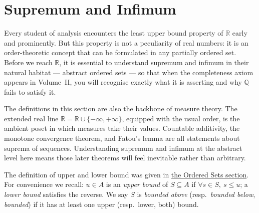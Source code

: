 
\section{Supremum and Infimum}\label{sec:sup-inf}



\begin{exposition}
Every student of analysis encounters the least upper bound property of
$\mathbb{R}$ early and prominently.  But this property is not a peculiarity
of real numbers: it is an order-theoretic concept that can be formulated in
any partially ordered set.  Before we reach $\mathbb{R}$, it is essential to
understand supremum and infimum in their natural habitat --- abstract ordered
sets --- so that when the completeness axiom appears in Volume~II, you will
recognise exactly what it is asserting and why $\mathbb{Q}$ fails to satisfy it.
\end{exposition}

\begin{exposition}
The definitions in this section are also the backbone of measure theory.
The extended real line $\overline{\mathbb{R}} = \mathbb{R} \cup \{-\infty,
+\infty\}$, equipped with the usual order, is the ambient poset in which
measures take their values.  Countable additivity, the monotone convergence
theorem, and Fatou's lemma are all statements about suprema of sequences.
Understanding supremum and infimum at the abstract level here means those
later theorems will feel inevitable rather than arbitrary.
\end{exposition}


\begin{exposition}
The definition of upper and lower bound was given in
\hyperref[def:bounds]{the Ordered Sets section}.  For convenience
we recall: $u \in A$ is an \emph{upper bound} of $S \subseteq A$ if
$\forall s \in S,\ s \leq u$; a \emph{lower bound} satisfies the
reverse.  We say $S$ is \emph{bounded above} (resp.\ \emph{bounded below},
\emph{bounded}) if it has at least one upper (resp.\ lower, both) bound.
\end{exposition}

